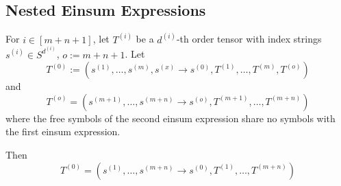 \subsection{Nested Einsum Expressions}
\begin{theorem}
    For $i \in [m + n + 1]$, let $T^{(i)}$ be a $d^{(i)}$-th order tensor with index strings $s^{(i)} \in S^{d^{(i)}}$, $o := m + n + 1$.
    Let
    $$T^{(0)} := (s^{(1)},\dots,s^{(m)}, s^{(x)} \rightarrow s^{(0)}, T^{(1)},\dots,T^{(m)}, T^{(o)})$$
    and
    $$T^{(o)} = (s^{(m + 1)},\dots,s^{(m + n)} \rightarrow s^{(o)}, T^{(m + 1)},\dots,T^{(m + n)})$$
    where the free symbols of the second einsum expression share no symbols with the first einsum expression.

    Then
    $$T^{(0)} = (s^{(1)}, \dots, s^{(m + n)} \rightarrow s^{(0)}, T^{(1)}, \dots, T^{(m + n)})$$
\end{theorem}
